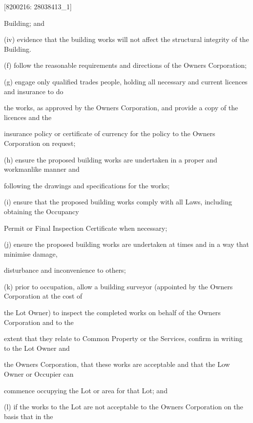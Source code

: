 \documentclass{article}
\begin{document}
{\fontsize{7.02}{1}[8200216: 28038413\_1] }

{\fontsize{10.02}{1}Building; and }

{\fontsize{9.962}{1}(iv) evidence that the building works will not affect the structural integrity of the Building. }

{\fontsize{9.962}{1}(f) follow the reasonable requirements and directions of the Owners Corporation; }

{\fontsize{9.962}{1}(g) engage only qualified trades people, holding all necessary and current licences and insurance to do }

{\fontsize{10.02}{1}the works, as approved by the Owners Corporation, and provide a copy of the licences and the }

{\fontsize{10.02}{1}insurance policy or certificate of currency for the policy to the Owners Corporation on request; }

{\fontsize{9.962}{1}(h) ensure the proposed building works are undertaken in a proper and workmanlike manner and }

{\fontsize{10.02}{1}following the drawings and specifications for the works; }

{\fontsize{9.962}{1}(i) ensure that the proposed building works comply with all Laws, including obtaining the Occupancy }

{\fontsize{10.02}{1}Permit or Final Inspection Certificate when necessary; }

{\fontsize{9.962}{1}(j) ensure the proposed building works are undertaken at times and in a way that minimise damage, }

{\fontsize{10.02}{1}disturbance and inconvenience to others; }

{\fontsize{9.962}{1}(k) prior to occupation, allow a building surveyor (appointed by the Owners Corporation at the cost of }

{\fontsize{10.02}{1}the Lot Owner) to inspect the completed works on behalf of the Owners Corporation and to the }

{\fontsize{10.02}{1}extent that they relate to Common Property or the Services, confirm in writing to the Lot Owner and }

{\fontsize{10.02}{1}the Owners Corporation, that these works are acceptable and that the Low Owner or Occupier can }

{\fontsize{10.02}{1}commence occupying the Lot or area for that Lot; and }

{\fontsize{9.962}{1}(l) if the works to the Lot are not acceptable to the Owners Corporation on the basis that in the }
\end{document}

